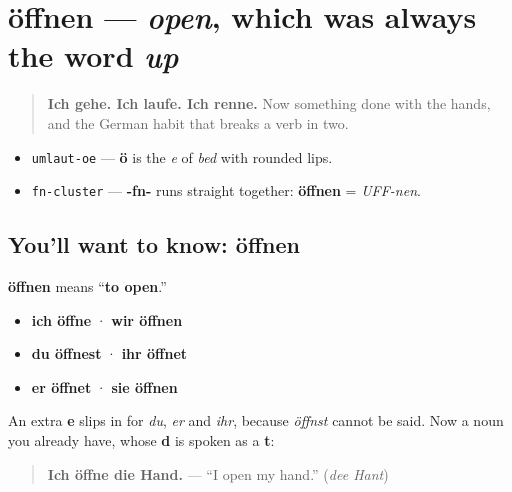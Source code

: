 \section[öffnen]{öffnen — \emph{open}, which was always the word \emph{up}}

\label{lesson:GE-C27-oeffnen}



\begin{quote}
\textbf{Ich gehe. Ich laufe. Ich renne.} Now something done with the hands, and the German habit that breaks a verb in two.
\end{quote}

\begin{sounds}
\begin{itemize}
\raggedright
  \item \texttt{umlaut-oe} — \textbf{ö} is the \emph{e} of \emph{bed} with rounded lips.
  \item \texttt{fn-cluster} — \textbf{-fn-} runs straight together: \textbf{öffnen} = \emph{UFF-nen}.
\end{itemize}
\end{sounds}

\subsection*{You'll want to know: öffnen}
\textbf{öffnen} means \textquotedblleft{}\textbf{to open}.\textquotedblright{}

\begin{itemize}
\raggedright
  \item \textbf{ich öffne} · \textbf{wir öffnen}
  \item \textbf{du öffnest} · \textbf{ihr öffnet}
  \item \textbf{er öffnet} · \textbf{sie öffnen}
\end{itemize}

An extra \textbf{e} slips in for \emph{du}, \emph{er} and \emph{ihr}, because \emph{öffnst} cannot be said. Now a noun you already have, whose \textbf{d} is spoken as a \textbf{t}:

\begin{quote}
\textbf{Ich öffne die Hand.} — \textquotedblleft{}I open my hand.\textquotedblright{} (\emph{dee Hant})
\end{quote}

